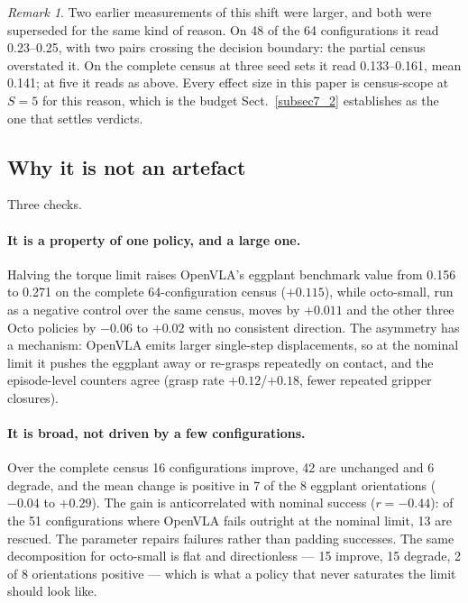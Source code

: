 \documentclass[pdflatex,iicol,sn-apa]{sn-jnl}
\theoremstyle{remark}
\newtheorem{remark}{Remark}
\begin{document}
\begin{remark}
Two earlier measurements of this shift were larger, and both were superseded for the same kind of
reason. On 48 of the 64 configurations it read 0.23--0.25, with two pairs crossing the decision
boundary: the partial census overstated it. On the complete census at three seed sets it read
0.133--0.161, mean 0.141; at five it reads as above. Every effect size in this paper is census-scope
at $S = 5$ for this reason, which is the budget Sect.~\ref{subsec7_2} establishes as the one that
settles verdicts.
\end{remark}

\subsection{Why it is not an artefact}\label{subsec7_4}

Three checks.

\paragraph{It is a property of one policy, and a large one.}
Halving the torque limit raises OpenVLA's eggplant benchmark value from 0.156 to 0.271 on the
complete 64-configuration census ($+0.115$), while octo-small, run as a negative control over the
same census, moves by $+0.011$ and the other three Octo policies by $-0.06$ to $+0.02$ with no
consistent direction. The asymmetry has a mechanism: OpenVLA emits larger single-step displacements,
so at the nominal limit it pushes the eggplant away or re-grasps repeatedly on contact, and the
episode-level counters agree (grasp rate $+0.12$/$+0.18$, fewer repeated gripper closures).

\paragraph{It is broad, not driven by a few configurations.}
Over the complete census 16 configurations improve, 42 are unchanged and 6 degrade, and the mean
change is positive in 7 of the 8 eggplant orientations ($-0.04$ to $+0.29$). The gain is
anticorrelated with nominal success ($r = -0.44$): of the 51 configurations where OpenVLA fails
outright at the nominal limit, 13 are rescued. The parameter repairs failures rather than padding
successes. The same decomposition for octo-small is flat and directionless --- 15 improve, 15
degrade, 2 of 8 orientations positive --- which is what a policy that never saturates the limit
should look like.
\end{document}
